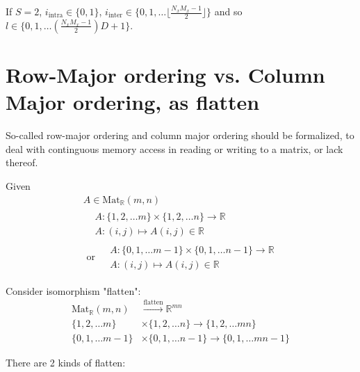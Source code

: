 \documentclass[10pt]{amsart}
\begin{document}
\begin{multicols*}{2}
If $S=2$, $i_{\text{intra}} \in \lbrace 0 , 1\rbrace$, $i_{\text{inter}} \in \lbrace 0 ,1, \dots \lfloor \frac{N_x M_x - 1}{2} \rfloor \rbrace$ and so $l \in \lbrace 0,1, \dots \left( \frac{N_x M_x - 1}{2} \right) D + 1 \rbrace$. 


\section{Row-Major ordering vs. Column Major ordering, as flatten}

So-called row-major ordering and column major ordering should be formalized, to deal with continguous memory access in reading or writing to a matrix, or lack thereof.  

Given 
\[
\begin{gathered}
	A \in \text{Mat}_{\mathbb{R}}(m,n) \\ 
	\begin{aligned}
		& A: \lbrace 1,2, \dots m \rbrace \times \lbrace 1,2, \dots n \rbrace \to \mathbb{R} \\
		& A: (i,j) \mapsto A(i,j) \in \mathbb{R} 
	\end{aligned} \\
	\text{ or } 
	\begin{aligned}
		& A: \lbrace 0,1, \dots m-1 \rbrace \times \lbrace 0,1, \dots n-1 \rbrace \to \mathbb{R} \\
		& A: (i,j) \mapsto A(i,j) \in \mathbb{R} 
	\end{aligned} 
\end{gathered}
\]

Consider isomorphism "flatten":
\begin{equation}
	\begin{aligned}
		\text{Mat}_{\mathbb{R}}(m,n)  & \xrightarrow{\text{flatten} } \mathbb{R}^{mn} \\
		\lbrace 1,2, \dots m \rbrace  & \times \lbrace 1,2, \dots n \rbrace \to \lbrace 1,2,\dots mn \rbrace \\
		\lbrace 0,1, \dots m-1 \rbrace  & \times \lbrace 0,1, \dots n-1 \rbrace \to \lbrace 0,1,\dots mn-1 \rbrace
	\end{aligned}
\end{equation}

There are 2 kinds of flatten:


\end{multicols*}
\end{document}
